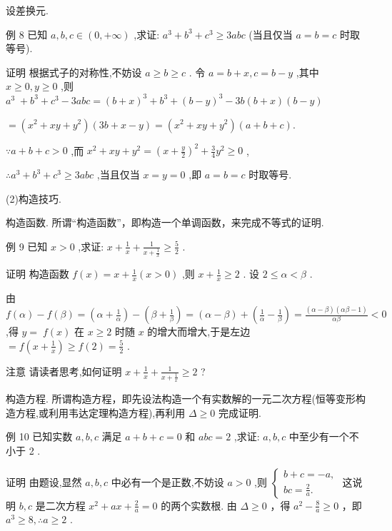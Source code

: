 \documentclass[10pt]{article}
\newcommand*\circled[1]{\tikz[baseline=(char.base)]{\node[shape=circle,draw,inner sep=1.5pt] (char) {\small #1};}}
\begin{document}
 \circled{2} 设差换元.

例 8 已知 \(a,b,c \in  \left( {0, + \infty }\right)\) ,求证: \({a}^{3} + {b}^{3} + {c}^{3} \geq  {3abc}\) (当且仅当 \(a = b = c\) 时取等号).

证明 根据式子的对称性,不妨设 \(a \geq  b \geq  c\) . 令 \(a = b + x,c = b - y\) ,其中 \(x \geq  0,y \geq  0\) ,则 \({a}^{3} \; + {b}^{3} + {c}^{3} - {3abc} = {\left( b + x\right) }^{3} + {b}^{3} + {\left( b - y\right) }^{3} - {3b}\left( {b + x}\right) \left( {b - y}\right)\)

\(= \left( {{x}^{2} + {xy} + {y}^{2}}\right) \left( {{3b} + x - y}\right)  = \left( {{x}^{2} + {xy} + {y}^{2}}\right) \left( {a + b + c}\right) .\)

\(\because a + b + c > 0\) ,而 \({x}^{2} + {xy} + {y}^{2} = {\left( x + \frac{y}{2}\right) }^{2} + \frac{3}{4}{y}^{2} \geq  0\) ,

\(\therefore {a}^{3} + {b}^{3} + {c}^{3} \geq  {3abc}\) ,当且仅当 \(x = y = 0\) ,即 \(a = b = c\) 时取等号.

(2)构造技巧.

 \circled{1} 构造函数. 所谓“构造函数”，即构造一个单调函数，来完成不等式的证明.

例 9 已知 \(x > 0\) ,求证: \(x + \frac{1}{x} + \frac{1}{x + \frac{1}{x}} \geq  \frac{5}{2}\) .

证明 构造函数 \(f\left( x\right)  = x + \frac{1}{x}\left( {x > 0}\right)\) ,则 \(x + \frac{1}{x} \geq  2\) . 设 \(2 \leq  \alpha  < \beta\) .

由 \(f\left( \alpha \right)  - f\left( \beta \right)  = \left( {\alpha  + \frac{1}{\alpha }}\right)  - \left( {\beta  + \frac{1}{\beta }}\right)  = \left( {\alpha  - \beta }\right)  + \left( {\frac{1}{\alpha } - \frac{1}{\beta }}\right)  = \frac{\left( {\alpha  - \beta }\right) \left( {{\alpha \beta } - 1}\right) }{\alpha \beta } < 0\) ,得 \(y = \; f\left( x\right)\) 在 \(x \geq  2\) 时随 \(x\) 的增大而增大,于是左边 \(= f\left( {x + \frac{1}{x}}\right)  \geq  f\left( 2\right)  = \frac{5}{2}\) .

注意 请读者思考,如何证明 \(x + \frac{1}{x} + \frac{1}{x + \frac{1}{x}} \geq  2\) ?

 \circled{2} 构造方程. 所谓构造方程，即先设法构造一个有实数解的一元二次方程(恒等变形构造方程,或利用韦达定理构造方程),再利用 \(\Delta  \geq  0\) 完成证明.

例 10 已知实数 \(a,b,c\) 满足 \(a + b + c = 0\) 和 \({abc} = 2\) ,求证: \(a,b,c\) 中至少有一个不小于 2 .

证明 由题设,显然 \(a,b,c\) 中必有一个是正数,不妨设 \(a > 0\) ,则 \(\left\{  \begin{array}{l} b + c =  - a, \\  {bc} = \frac{2}{a}. \end{array}\right.\) 这说明 \(b,c\) 是二次方程 \({x}^{2} + {ax} + \frac{2}{a} = 0\) 的两个实数根. 由 \(\Delta  \geq  0\) ，得 \({a}^{2} - \frac{8}{a} \geq  0\) ，即 \({a}^{3} \geq  8,\therefore a \geq  2\) .
\end{document}
